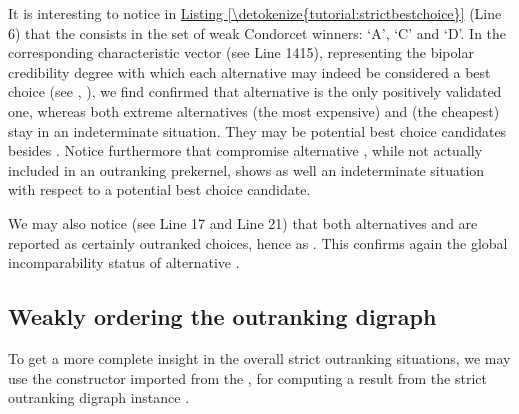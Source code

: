 \documentclass[a4paper,12pt,english]{sphinxhowto}
\begin{document}
It is interesting to notice in \hyperref[\detokenize{tutorial:strictbestchoice}]{Listing \ref{\detokenize{tutorial:strictbestchoice}}} (Line 6) that the  consists in the set of weak Condorcet winners: ‘A’, ‘C’ and ‘D’. In the corresponding characteristic vector (see Line 14\sphinxhyphen{}15), representing the bipolar credibility degree with which each alternative may indeed be considered a best choice (see , ), we find confirmed that alternative  is the only positively validated one, whereas both extreme alternatives \sphinxhyphen{}  (the most expensive) and  (the cheapest) \sphinxhyphen{} stay in an indeterminate situation. They may be potential best choice candidates besides . Notice furthermore that compromise alternative , while not actually included in an outranking prekernel, shows as well an indeterminate situation with respect to  a potential best choice candidate.

We may also notice (see Line 17 and Line 21) that both alternatives  and  are reported as certainly outranked choices, hence as  . This confirms again the global incomparability status of alternative .


\subsection{Weakly ordering the outranking digraph}
\label{\detokenize{tutorial:weakly-ordering-the-outranking-digraph}}
To get a more complete insight in the overall strict outranking situations, we may use the  constructor imported from the , for computing a  result from the strict outranking digraph instance .
\end{document}
